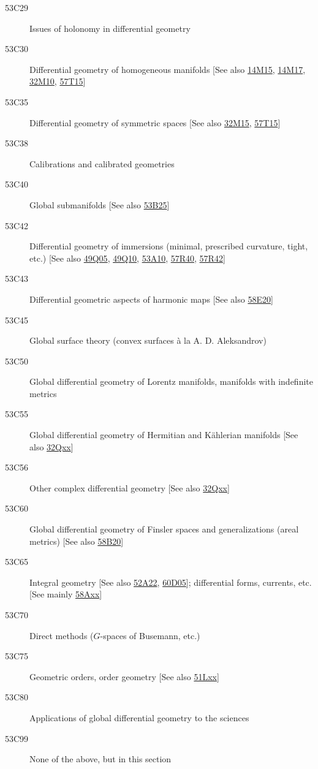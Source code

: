 \begin{description}
\item [53C29]\label{53C29} Issues of holonomy in differential geometry 
\item [53C30]\label{53C30} Differential geometry of homogeneous manifolds [See also \hyperref[14M15]{14M15}, \hyperref[14M17]{14M17}, \hyperref[32M10]{32M10}, \hyperref[57T15]{57T15}]
\item [53C35]\label{53C35} Differential geometry of symmetric spaces [See also \hyperref[32M15]{32M15}, \hyperref[57T15]{57T15}]
\item [53C38]\label{53C38} Calibrations and calibrated geometries
\item [53C40]\label{53C40} Global submanifolds [See also \hyperref[53B25]{53B25}]
\item [53C42]\label{53C42} Differential geometry of immersions (minimal, prescribed curvature, tight, etc.) [See also \hyperref[49Q05]{49Q05}, \hyperref[49Q10]{49Q10}, \hyperref[53A10]{53A10}, \hyperref[57R40]{57R40}, \hyperref[57R42]{57R42}]
\item [53C43]\label{53C43} Differential geometric aspects of harmonic maps [See also \hyperref[58E20]{58E20}]
\item [53C45]\label{53C45} Global surface theory (convex surfaces \`{a} la A. D. Aleksandrov)
\item [53C50]\label{53C50} Global differential geometry of Lorentz manifolds, manifolds with indefinite metrics
\item [53C55]\label{53C55} Global differential geometry of Hermitian and K\"{a}hlerian manifolds [See also \hyperref[32Qxx]{32Qxx}]
\item [53C56]\label{53C56} Other complex differential geometry [See also \hyperref[32Qxx]{32Qxx}]
\item [53C60]\label{53C60} Global differential geometry of Finsler spaces and generalizations (areal metrics) [See also \hyperref[58B20]{58B20}]
\item [53C65]\label{53C65} Integral geometry [See also \hyperref[52A22]{52A22}, \hyperref[60D05]{60D05}]; differential forms, currents, etc. [See mainly \hyperref[58Axx]{58Axx}]
\item [53C70]\label{53C70} Direct methods ($G$-spaces of Busemann, etc.)
\item [53C75]\label{53C75} Geometric orders, order geometry [See also \hyperref[51Lxx]{51Lxx}]
\item [53C80]\label{53C80} Applications of global differential geometry to the sciences
\item [53C99]\label{53C99} None of the above, but in this section
\end{description}
